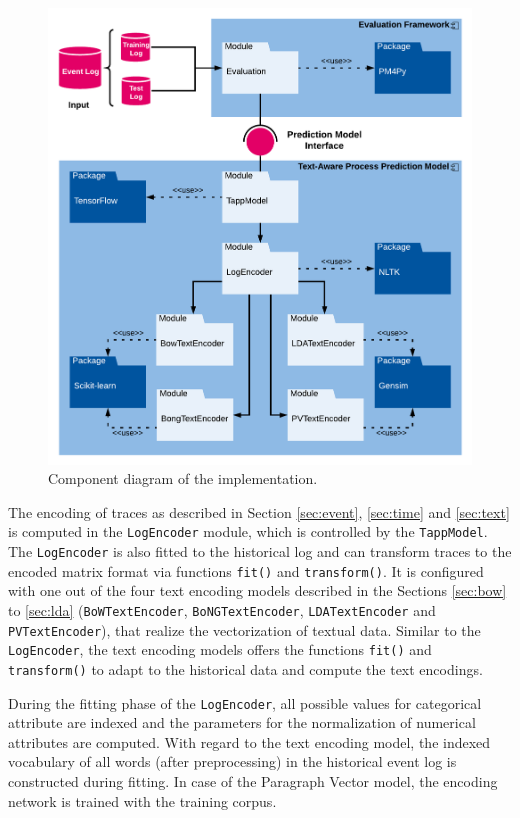 \begin{figure}[htbp!]
	\centering
	\includegraphics[width=\textwidth]{figures/implementation}
	\caption[Component diagram of the implementation]{Component diagram of the implementation.}
	\label{fig:/implementation}
\end{figure}

The encoding of traces as described in Section \ref{sec:event}, \ref{sec:time} and \ref{sec:text} is computed in the \texttt{LogEncoder} module, which is controlled by the \texttt{TappModel}.
The \texttt{LogEncoder} is also fitted to the historical log and can transform traces to the encoded matrix format via functions \texttt{fit()} and \texttt{transform()}.
It is configured with one out of the four text encoding models described in the Sections \ref{sec:bow} to \ref{sec:lda} (\texttt{BoWTextEncoder},  \texttt{BoNGTextEncoder}, \texttt{LDATextEncoder} and  \texttt{PVTextEncoder}), that realize the vectorization of textual data.
Similar to the \texttt{LogEncoder}, the text encoding models offers the functions \texttt{fit()} and \texttt{transform()} to adapt to the historical data and compute the text encodings.

During the fitting phase of the  \texttt{LogEncoder}, all possible values for categorical attribute are indexed and the parameters for the normalization of numerical attributes are computed.
With regard to the text encoding model, the indexed vocabulary of all words (after preprocessing) in the historical event log is constructed during fitting.
In case of the Paragraph Vector model, the encoding network is trained with the training corpus.

